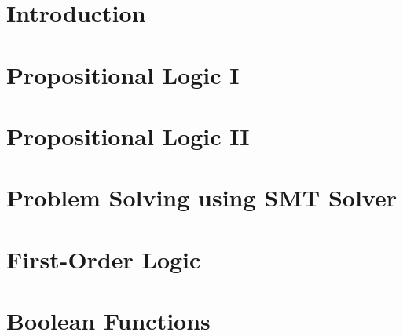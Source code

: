 \documentclass[12pt,openany]{book}
\begin{document}
	
	
	\tableofcontents
	\newpage
	
	\newpage
	\chapter{Introduction}
	
	
	\newpage
%	
	
	\newpage
	\chapter{Propositional Logic I}
	
	
	\newpage
	\chapter{Propositional Logic II}
	
	
	\newpage
	\chapter{Problem Solving using SMT Solver}
	
	
	\newpage
	\chapter{First-Order Logic}
	
		
	\newpage
	\appendix
	\chapter{Boolean Functions}
	
	
	
	
	
\end{document}
